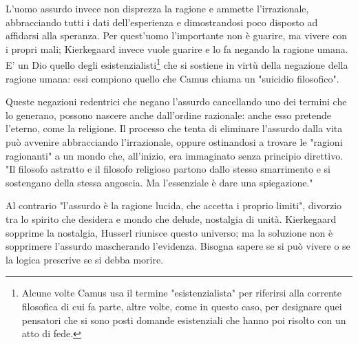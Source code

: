 \documentclass[a4paper,12pt,oneside]{article}%
\begin{document}
L'uomo assurdo invece non disprezza la ragione e ammette l'irrazionale, abbracciando tutti i dati dell'esperienza e dimostrandosi poco disposto ad affidarsi alla speranza. Per quest'uomo l'importante non è guarire, ma vivere con i propri mali; Kierkegaard invece vuole guarire e lo fa negando la ragione umana. E' un Dio quello degli esistenzialisti\footnote{Alcune volte Camus usa il termine "esistenzialista" per riferirsi alla corrente filosofica di cui fa parte, altre volte, come in questo caso, per designare quei pensatori che si sono posti domande esistenziali che hanno poi risolto con un atto di fede.} che si sostiene in virtù della negazione della ragione umana: essi compiono quello che Camus chiama un "suicidio filosofico".

Queste negazioni redentrici che negano l'assurdo cancellando uno dei termini che lo generano, possono nascere anche dall'ordine razionale: anche esso pretende l'eterno, come la religione. Il processo che tenta di eliminare l'assurdo dalla vita può avvenire abbracciando l'irrazionale, oppure ostinandosi a trovare le "ragioni ragionanti" a un mondo che, all'inizio, era immaginato senza principio direttivo. "Il filosofo astratto e il filosofo religioso partono dallo stesso smarrimento e si sostengano della stessa angoscia. Ma l'essenziale è dare una spiegazione."

Al contrario "l'assurdo è la ragione lucida, che accetta i proprio limiti", divorzio tra lo spirito che desidera e mondo che delude, nostalgia di unità. Kierkegaard sopprime la nostalgia, Husserl riunisce questo universo; ma la soluzione non è sopprimere l'assurdo mascherando l'evidenza. Bisogna sapere se si può vivere o se la logica prescrive se si debba morire.




	
	
	
\end{document}
